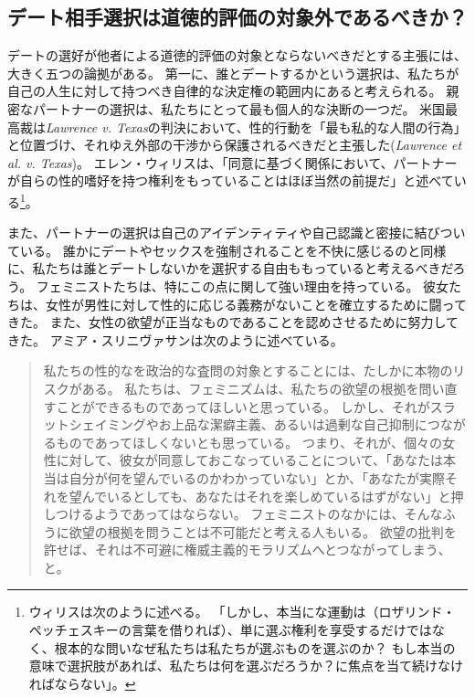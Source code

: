 \documentclass[paper=a4,book,openany]{jlreq} \usepackage{mystyle}
\begin{document}
\subsection{デート相手選択は道徳的評価の対象外であるべきか？}

デートの選好が他者による道徳的評価の対象とならないべきだとする主張には、大きく五つの論拠がある。
第一に、誰とデートするかという選択は、私たちが自己の人生に対して持つべき自律的な決定権の範囲内にあると考えられる。
親密なパートナーの選択は、私たちにとって最も個人的な決断の一つだ。
米国最高裁は\emph{Lawrence v. Texas}の判決において、性的行動を「最も私的な人間の行為」と位置づけ、それゆえ外部の干渉から保護されるべきだと主張した(\emph{Lawrence et al. v. Texas})。
エレン・ウィリスは、「同意に基づく関係において、パートナーが自らの性的嗜好を持つ権利をもっていることはほぼ当然の前提だ」と述べている\footnote{ウィリスは次のように述べる。
「しかし、本当にな運動は（ロザリンド・ペッチェスキーの言葉を借りれば）、単に選ぶ権利を享受するだけではなく、根本的な問い{\DDASH}なぜ私たちは私たちが選ぶものを選ぶのか？ もし本当の意味で選択肢があれば、私たちは何を選ぶだろうか？{\DDASH}に焦点を当て続けなければならない」。
}\citep[p.14]{willis92:_no_more_nice_girls}。

また、パートナーの選択は自己のアイデンティティや自己認識と密接に結びついている。
誰かにデートやセックスを強制されることを不快に感じるのと同様に、私たちは誰とデートしないかを選択する自由ももっていると考えるべきだろう。
フェミニストたちは、特にこの点に関して強い理由を持っている。
彼女たちは、女性が男性に対して性的に応じる義務がないことを確立するために闘ってきた。
また、女性の欲望が正当なものであることを認めさせるために努力してきた。
アミア・スリニヴァサンは次のように述べている。

\begin{quote}
私たちの性的なを政治的な査問の対象とすることには、たしかに本物のリスクがある。
私たちは、フェミニズムは、私たちの欲望の根拠を問い直すことができるものであってほしいと思っている。
しかし、それがスラットシェイミングやお上品な潔癖主義、あるいは過剰な自己抑制につながるものであってほしくないとも思っている。
つまり、それが、個々の女性に対して、彼女が同意しておこなっていることについて、「あなたは本当は自分が何を望んでいるのかわかっていない」とか、「あなたが実際それを望んでいるとしても、あなたはそれを楽しめているはずがない」と押しつけるようであってはならない。
フェミニストのなかには、そんなふうに欲望の根拠を問うことは不可能だと考える人もいる。
欲望の批判を許せば、それは不可避に権威主義的モラリズムへとつながってしまう、と。
\citep{srinivasan18:_does_anyon_have_right_sex}
\end{quote}
\end{document}
